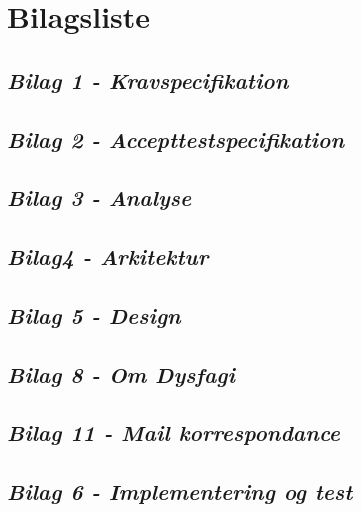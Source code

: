 \chapter{Bilagsliste}
\section{\textit{Bilag 1 - Kravspecifikation}} \label{bilag1}
\section{\textit{Bilag 2 - Accepttestspecifikation}} \label{bilag2}
\section{\textit{Bilag 3 - Analyse}} \label{bilag3}
\section{\textit{Bilag4 - Arkitektur}} \label{bilag4}
\section{\textit{Bilag 5 - Design}} \label{bilag5}
\section{\textit{Bilag 8 - Om Dysfagi}} \label{bilag8}
\section{\textit{Bilag 11 - Mail korrespondance}} \label{bilag11}
\section{\textit{Bilag 6 - Implementering og test}} \label{bilag6}


